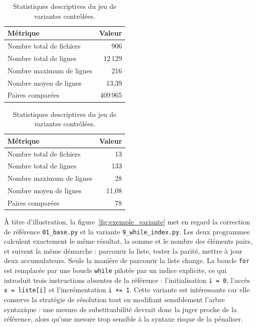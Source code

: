\documentclass[12pt,a4paper,oneside]{report}
\begin{document}
\begin{table}[htbp]
\centering
\small
\begin{minipage}[t]{0.48\textwidth}
\centering
\begin{tabular}{lr}
\toprule
\textbf{Métrique} & \textbf{Valeur} \\
\midrule
Nombre total de fichiers  & 906 \\
Nombre total de lignes    & 12\,129 \\
Nombre maximum de lignes  & 216 \\
Nombre moyen de lignes    & 13,39 \\
Paires comparées          & 409\,965 \\
\bottomrule
\end{tabular}
\caption{Statistiques descriptives du corpus de corrections de référence.}
\label{tab:corpus}
\end{minipage}%
\hfill
\begin{minipage}[t]{0.48\textwidth}
\centering
\begin{tabular}{lr}
\toprule
\textbf{Métrique} & \textbf{Valeur} \\
\midrule
Nombre total de fichiers  & 13 \\
Nombre total de lignes    & 133 \\
Nombre maximum de lignes  & 28 \\
Nombre moyen de lignes    & 11,08 \\
Paires comparées          & 78 \\
\bottomrule
\end{tabular}
\caption{Statistiques descriptives du jeu de variantes contrôlées.}
\label{tab:variantes}
\end{minipage}
\end{table}

À titre d'illustration, la figure~\ref{fig:exemple_variante} met en regard la
correction de référence \texttt{01\_base.py} et la variante
\texttt{9\_while\_index.py}. Les deux programmes calculent exactement le même
résultat, la somme et le nombre des éléments pairs, et suivent la même
démarche : parcourir la liste, tester la parité, mettre à jour deux
accumulateurs. Seule la manière de parcourir la liste change. La boucle
\texttt{for} est remplacée par une boucle \texttt{while} pilotée par un indice
explicite, ce qui introduit trois instructions absentes de la référence :
l'initialisation \texttt{i = 0}, l'accès \texttt{x = liste[i]} et
l'incrémentation \texttt{i += 1}. Cette variante est intéressante car elle
conserve la stratégie de résolution tout en modifiant sensiblement l'arbre
syntaxique : une mesure de substituabilité devrait donc la juger proche de la
référence, alors qu'une mesure trop sensible à la syntaxe risque de la
pénaliser.
\end{document}
